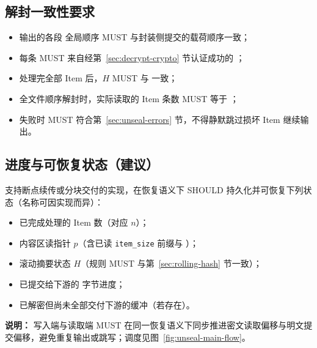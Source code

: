 \subsection{解封一致性要求}\label{sec:unseal-consistency}
\begin{itemize}
  \item 输出的各段  全局顺序 MUST 与封装侧提交的载荷顺序一致；
  \item 每条  MUST 来自经第~\ref{sec:decrypt-crypto} 节认证成功的 ；
  \item 处理完全部 Item 后，$H$ MUST 与  一致；
  \item 全文件顺序解封时，实际读取的 Item 条数 MUST 等于 ；
  \item 失败时 MUST 符合第~\ref{sec:unseal-errors} 节，不得静默跳过损坏 Item 继续输出。
\end{itemize}

\subsection{进度与可恢复状态（建议）}\label{sec:unseal-recoverable}
支持断点续传或分块交付的实现，在恢复语义下 SHOULD 持久化并可恢复下列状态（名称可因实现而异）：
\begin{itemize}
  \item 已完成处理的 Item 数（对应 $n$）；
  \item 内容区读指针 $p$（含已读 \texttt{item\_size} 前缀与 ）；
  \item 滚动摘要状态 $H$（规则 MUST 与第~\ref{sec:rolling-hash} 节一致）；
  \item 已提交给下游的  字节进度；
  \item 已解密但尚未全部交付下游的缓冲（若存在）。
\end{itemize}

\textbf{说明：}
写入端与读取端 MUST 在同一恢复语义下同步推进密文读取偏移与明文提交偏移，避免重复输出或跳写；调度见图~\ref{fig:unseal-main-flow}。
